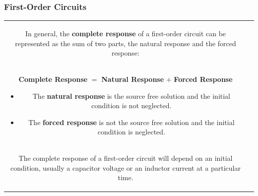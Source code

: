 \documentclass[aspectratio=169]{beamer}
\begin{document}
\begin{frame}[fragile]
	\frametitle{First-Order Circuits}
		\begin{tabular}{cc}
			\begin{columns}
				\begin{column}{1\textwidth}  %
In general, the \textbf{complete response} of a first-order circuit can be represented as the sum of two
parts, the natural response and the forced response:

				\end{column}
			\end{columns}\\
		
\begin{columns}
	\begin{column}{1\textwidth}  %
\center \textbf{Complete Response} $=$ \textbf{Natural Response} $+$ \textbf{Forced Response} \newline
\small		\begin{itemize}
\item The \textbf{natural response} is the source free solution and the initial condition is not neglected. 
\item The \textbf{forced response} is not the source free solution and the initial condition is neglected.			 
		\end{itemize}		
				\end{column}
		\end{columns}\\

		\begin{columns}
	\begin{column}{1\textwidth}  %
\newline \newline  \small The complete response of a first-order circuit will depend on an initial condition, usually a
capacitor voltage or an inductor current at a particular time.
				\end{column}
		\end{columns}

		
	\end{tabular}	
	
\end{frame}

\end{document}

